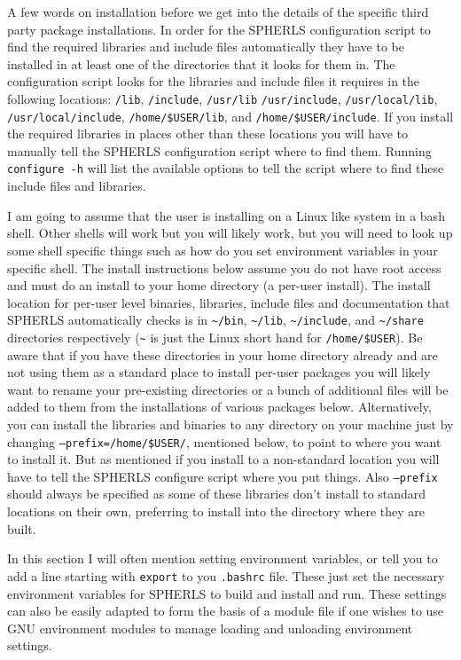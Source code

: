 \documentclass[12pt,a4paper]{book}
\begin{document}
A few words on installation before we get into the details of the specific third party package installations. In order for the SPHERLS configuration script to find the required libraries and include files automatically they have to be installed in at least one of the directories that it looks for them in. The configuration script looks for the libraries and include files it requires in the following locations: {\tt /lib}, {\tt /include}, {\tt /usr/\-lib} {\tt /usr/\-include}, {\tt /usr/local/lib}, {\tt /usr/\-local/\-include}, {\tt /home/\-\$USER/\-lib}, and {\tt /home/\-\$USER/\-include}. If you install the required libraries in places other than these locations you will have to manually tell the SPHERLS configuration script where to find them. Running {\tt configure -h} will list the available options to tell the script where to find these include files and libraries.

I am going to assume that the user is installing on a Linux like system in a bash shell. Other shells will work but you will likely work, but you will need to look up some shell specific things such as how do you set environment variables in your specific shell. The install instructions below assume you do not have root access and must do an install to your home directory (a per-user install). The install location for per-user level binaries, libraries, include files and documentation that SPHERLS automatically checks is in {\tt \textasciitilde/bin}, {\tt \textasciitilde/lib}, {\tt \textasciitilde/include}, and {\tt \textasciitilde/share} directories respectively ({\tt \textasciitilde} is just the Linux short hand for {\tt /home/\-\$USER}). Be aware that if you have these directories in your home directory already and are not using them as a standard place to install per-user packages you will likely want to rename your pre-existing directories or a bunch of additional files will be added to them from the installations of various packages below. Alternatively, you can install the libraries and binaries to any directory on your machine just by changing {\tt --prefix\-=/home/\-\$USER/}, mentioned below, to point to where you want to install it. But as mentioned if you install to a non-standard location you will have to tell the SPHERLS configure script where you put things. Also {\tt --prefix} should always be specified as some of these libraries don't install to standard locations on their own, preferring to install into the directory where they are built.

In this section I will often mention setting environment variables, or tell you to add a line starting with {\tt export} to you {\tt .bashrc} file. These just set the necessary environment variables for SPHERLS to build and install and run. These settings can also be easily adapted to form the basis of a module file if one wishes to use GNU environment modules to manage loading and unloading environment settings.
\end{document}

